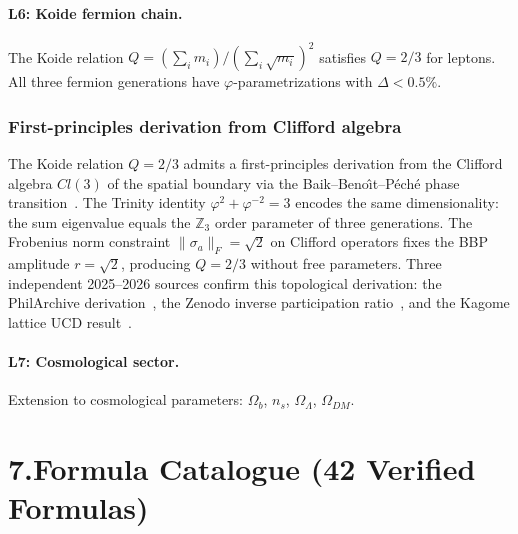\documentclass[10pt,a4paper]{article}
\begin{document}
\paragraph{L6: Koide fermion chain.}
The Koide relation $Q = (\sum_i m_i)/(\sum_i \sqrt{m_i})^2$ satisfies $Q=2/3$ for leptons.
All three fermion generations have $\varphi$-parametrizations with $\Delta < 0.5\%$.

\subsubsection{First-principles derivation from Clifford algebra}
The Koide relation $Q = 2/3$ admits a first-principles derivation from the
Clifford algebra $Cl(3)$ of the spatial boundary via the
Baik--Beno{\^\i}t--P{\'e}ch{\'e} phase transition~\cite{abdirm2026}.
The Trinity identity $\varphi^2 + \varphi^{-2} = 3$ encodes the same
dimensionality: the sum eigenvalue equals the $\mathbb{Z}_3$ order parameter of three
generations. The Frobenius norm constraint $\|\sigma_a\|_F = \sqrt{2}$ on Clifford
operators fixes the BBP amplitude $r = \sqrt{2}$, producing $Q = 2/3$ without free
parameters. Three independent 2025--2026 sources confirm this topological
derivation: the PhilArchive derivation~\cite{abdirm2026}, the Zenodo inverse
participation ratio~\cite{zenodo19271888}, and the Kagome lattice UCD
result~\cite{kagome2026}.

\paragraph{L7: Cosmological sector.}
Extension to cosmological parameters: $\Omega_b$, $n_s$, $\Omega_\Lambda$, $\Omega_{DM}$.

\section*{7.\quad Formula Catalogue (42 Verified Formulas)}
\end{document}
